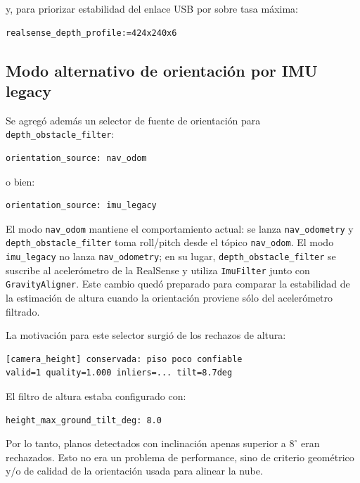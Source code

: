 y, para priorizar estabilidad del enlace USB por sobre tasa máxima:

\begin{verbatim}
realsense_depth_profile:=424x240x6
\end{verbatim}

\subsection{Modo alternativo de orientación por IMU legacy}
\label{subsec:perf-imu-legacy}

Se agregó además un selector de fuente de orientación para
\texttt{depth\_obstacle\_filter}:

\begin{verbatim}
orientation_source: nav_odom
\end{verbatim}

o bien:

\begin{verbatim}
orientation_source: imu_legacy
\end{verbatim}

El modo \texttt{nav\_odom} mantiene el comportamiento actual: se lanza
\texttt{nav\_odometry} y \texttt{depth\_obstacle\_filter} toma roll/pitch desde
el tópico \texttt{nav\_odom}. El modo \texttt{imu\_legacy} no lanza
\texttt{nav\_odometry}; en su lugar, \texttt{depth\_obstacle\_filter} se
suscribe al acelerómetro de la RealSense y utiliza \texttt{ImuFilter} junto con
\texttt{GravityAligner}. Este cambio quedó preparado para comparar la
estabilidad de la estimación de altura cuando la orientación proviene sólo del
acelerómetro filtrado.

La motivación para este selector surgió de los rechazos de altura:

\begin{verbatim}
[camera_height] conservada: piso poco confiable
valid=1 quality=1.000 inliers=... tilt=8.7deg
\end{verbatim}

El filtro de altura estaba configurado con:

\begin{verbatim}
height_max_ground_tilt_deg: 8.0
\end{verbatim}

Por lo tanto, planos detectados con inclinación apenas superior a $8^\circ$
eran rechazados. Esto no era un problema de performance, sino de criterio
geométrico y/o de calidad de la orientación usada para alinear la nube.

